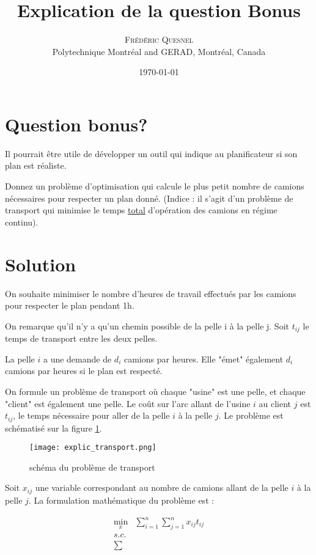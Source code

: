 \documentclass[letterpaper,12pt]{article}
\title{ Explication de la question Bonus }
\author{\textsc{\large{Frédéric Quesnel}} \\ Polytechnique Montr\'eal and GERAD, Montr\'eal, Canada}
\date{\today}
\let\oldref\ref
\newcommand\myref[1]{\oldref{#1}}
\renewcommand{\ref}[1]{{\myref{#1}}}
\begin{document}
	
	\maketitle
	
\section*{Question bonus?}
Il pourrait être utile de développer un outil qui indique au planificateur si son plan est réaliste.
	
Donnez un problème d'optimisation qui calcule le plus petit nombre de camions nécessaires pour respecter un plan donné. (Indice : il s'agit d'un problème de transport qui minimise le temps \underline{total} d'opération des camions en régime continu).
	

\section*{Solution}

On souhaite minimiser le nombre d'heures de travail effectués par les camions pour respecter le plan pendant 1h. 

On remarque qu'il n'y a qu'un chemin possible de la pelle i à la pelle j. Soit $t_{ij}$ le temps de transport entre les deux pelles.

La pelle $i$ a une demande de $d_i$ camions par heures. Elle "émet" également $d_i$ camions par heures si le plan est respecté. 


On formule un problème de transport où chaque "usine" est une pelle, et chaque "client" est également une pelle. Le coût sur l'arc allant de l'usine $i$ au client $j$ est $t_{ij}$, le temps nécessaire pour aller de la pelle $i$ à la pelle $j$. Le problème est schématisé sur la figure \ref{fig}.

\begin{figure}
	\texttt{[image: explic\_transport.png]}
	\caption{\label{fig}schéma du problème de transport}
\end{figure}


Soit $x_{ij}$ une variable correspondant au nombre de camions allant de la pelle $i$ à la pelle $j$. La formulation mathématique du problème est :

\begin{align}
\min\limits_{x} & \sum\limits_{i=1}^n \sum\limits_{j=1}^n x_{ij} t_{ij} \\
s.c. \\
\sum
\end{align}


	
	
\end{document}
